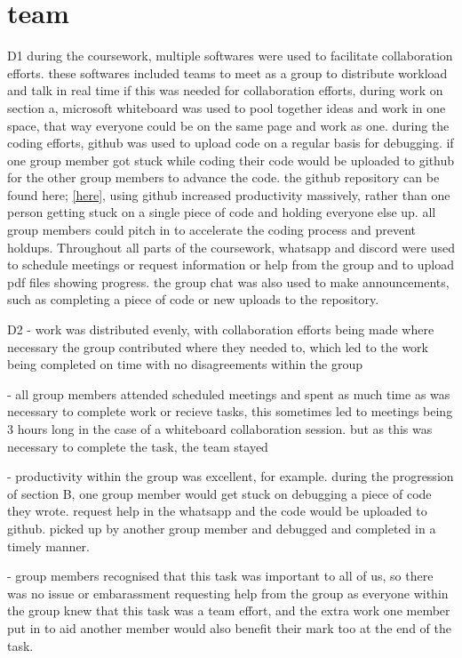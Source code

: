 \section{team}%
\label{closedloopy}

D1 during the coursework, multiple softwares were used to facilitate collaboration efforts. 
these softwares included teams to meet as a group to distribute workload and talk in real 
time if this was needed for collaboration efforts, during work on section a, microsoft 
whiteboard was used to pool together ideas and work in one space, that way everyone 
could be on the same page and work as one. during the coding efforts, github was used to
upload code on a regular basis for debugging. if one group member got stuck while coding
their code would be uploaded to github for the other group members to advance the code.
the github repository can be found here; \href{https://github.com/ELE2024-Controls/Coursework}{[here]}, using github increased productivity
massively, rather than one person getting stuck on a single piece of code and holding 
everyone else up. all group members could pitch in to accelerate the coding process
and prevent holdups. Throughout all parts of the coursework, whatsapp and discord were
used to schedule meetings or request information or help from the group and to upload pdf
files showing progress. the group chat was also used to make announcements, such as 
completing a piece of code or new uploads to the repository.

D2 - work was distributed evenly, with collaboration efforts being made where necessary
     the group contributed where they needed to, which led to the work being completed
     on time with no disagreements within the group
   
   - all group members attended scheduled meetings and spent as much time as was necessary 
     to complete work or recieve tasks, this sometimes led to meetings being 3 hours long
     in the case of a whiteboard collaboration session. but as this was necessary to 
     complete the task, the team stayed
   
   - productivity within the group was excellent, for example. during the progression of 
     section B, one group member would get stuck on debugging a piece of code they wrote.
     request help in the whatsapp and the code would be uploaded to github. picked up by 
     another group member and debugged and completed in a timely manner.

   - group members recognised that this task was important to all of us, so there was no
     issue or embarassment requesting help from the group as everyone within the group 
     knew that this task was a team effort, and the extra work one member put in to aid 
     another member would also benefit their mark too at the end of the task. 

